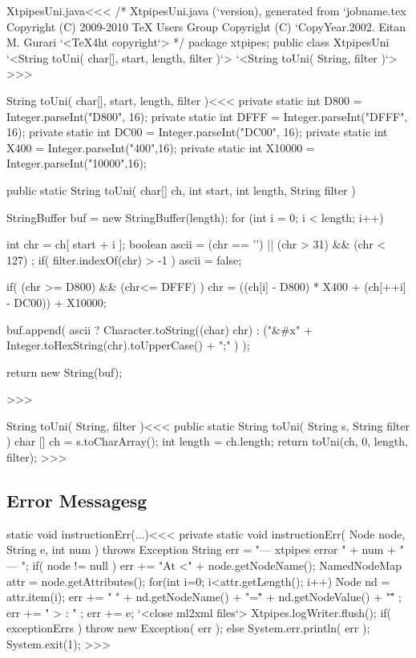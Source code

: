 \documentclass{article}
\begin{document}


\<XtpipesUni.java\><<<
/* XtpipesUni.java (`version), generated from `jobname.tex
   Copyright (C) 2009-2010 TeX Users Group
   Copyright (C) `CopyYear.2002. Eitan M. Gurari
`<TeX4ht copyright`> */
package xtpipes;
public class XtpipesUni{
   `<String toUni( char[], start, length, filter )`>
   `<String toUni( String, filter )`>
}
>>>

\<String toUni( char[], start, length, filter )\><<<
private static int D800 = Integer.parseInt("D800", 16);
private static int DFFF = Integer.parseInt("DFFF", 16);
private static int DC00 = Integer.parseInt("DC00", 16);
private static int X400 = Integer.parseInt("400",16);
private static int X10000 = Integer.parseInt("10000",16);


public static String toUni( char[] ch, int start, int length,
                                           String filter ){
   StringBuffer buf = new StringBuffer(length);
   for (int i = 0; i < length; i++) {
       int chr = ch[ start + i ];
       boolean ascii =  (chr == '\n')
                        || (chr > 31) && (chr < 127) ;
       if( filter.indexOf(chr) > -1 ){ ascii = false; }

       if( (chr >= D800) && (chr<= DFFF) ){
          chr = ((ch[i] - D800) * X400 + (ch[++i] - DC00)) + X10000;
       }


       buf.append(
         ascii ? Character.toString((char) chr)
               : ("&#x"
                 + Integer.toHexString(chr).toUpperCase()
                 + ";" ) );
   }
   return new String(buf);
}
>>>

\<String toUni( String, filter )\><<<
public static String toUni( String s, String filter ){
   char [] ch = s.toCharArray();
   int length = ch.length;
   return toUni(ch, 0, length, filter);
}
>>>







\subsection{Error Messagesg}






\<static void instructionErr(...)\><<<
private static void instructionErr( Node node, String e, int num )
                                     throws Exception {
   String err = "--- xtpipes error " + num + " --- ";
   if( node != null ){
      err += "At <" + node.getNodeName();
      NamedNodeMap attr = node.getAttributes();
      for(int i=0; i<attr.getLength(); i++){
         Node nd = attr.item(i);
         err += " " +
             nd.getNodeName()  + "=\"" +
             nd.getNodeValue() + "\"" ;
      }
      err += " > : " ;
   }
   err += e;
   `<close ml2xml files`>
   Xtpipes.logWriter.flush();
   if( exceptionErrs ) { throw new Exception( err );  }
   else {
      System.err.println( err );
      System.exit(1);
   }
}
>>>
\end{document}
